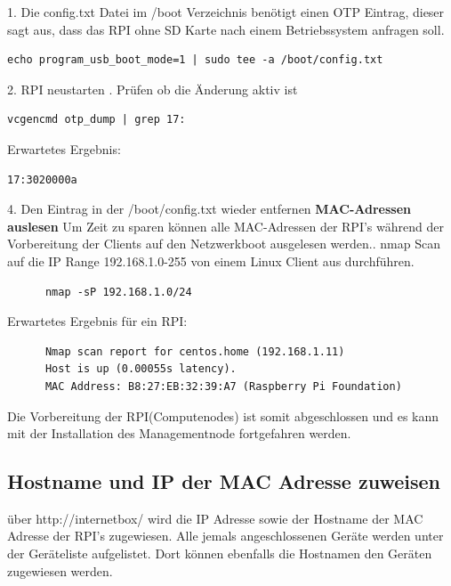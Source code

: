1. Die config.txt Datei im /boot Verzeichnis benötigt einen OTP Eintrag, dieser sagt aus, dass das RPI ohne SD Karte nach einem Betriebssystem anfragen soll. 
\begin{lstlisting}
echo program_usb_boot_mode=1 | sudo tee -a /boot/config.txt
\end{lstlisting}
2. RPI neustarten . Prüfen ob die Änderung aktiv ist
\begin{lstlisting}
vcgencmd otp_dump | grep 17:
\end{lstlisting}
Erwartetes Ergebnis:
\begin{lstlisting}
17:3020000a
\end{lstlisting}
4. Den Eintrag in der /boot/config.txt wieder entfernen\newline
\textbf{MAC-Adressen auslesen}\newline
Um Zeit zu sparen können alle MAC-Adressen der RPI's während der Vorbereitung der Clients auf den Netzwerkboot ausgelesen werden.. nmap Scan auf die IP Range 192.168.1.0-255 von einem Linux Client aus durchführen.
\begin{lstlisting}
	  nmap -sP 192.168.1.0/24  
\end{lstlisting}
Erwartetes Ergebnis für ein RPI:
\begin{lstlisting}
	  Nmap scan report for centos.home (192.168.1.11)
	  Host is up (0.00055s latency).
	  MAC Address: B8:27:EB:32:39:A7 (Raspberry Pi Foundation)   
\end{lstlisting}

Die Vorbereitung der RPI(Computenodes) ist somit abgeschlossen und es kann mit der Installation des Managementnode fortgefahren werden.

\subsection{Hostname und IP der MAC Adresse zuweisen}
über http://internetbox/ wird die IP Adresse sowie der Hostname der MAC Adresse der RPI's zugewiesen. Alle jemals angeschlossenen Geräte werden unter der Geräteliste aufgelistet. Dort können ebenfalls die Hostnamen den Geräten zugewiesen werden.


